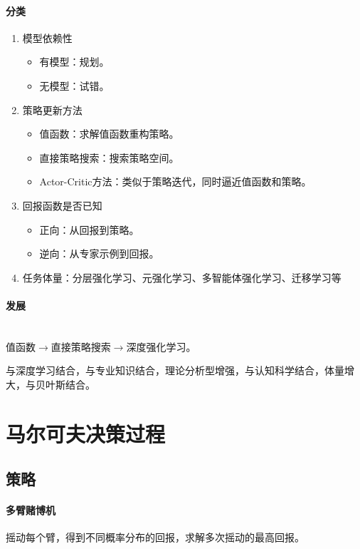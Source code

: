 \documentclass[
12pt, %
a4paper, 
oneside, %
headinclude,footinclude, %
]{scrartcl}
\begin{document}
\paragraph{分类}
\begin{enumerate}
\item 模型依赖性
\begin{itemize}
\item 有模型：规划。
\item 无模型：试错。
\end{itemize}
\item 策略更新方法
\begin{itemize}
\item 值函数：求解值函数重构策略。
\item 直接策略搜索：搜索策略空间。
\item Actor-Critic方法：类似于策略迭代，同时逼近值函数和策略。
\end{itemize}
\item 回报函数是否已知
\begin{itemize}
\item 正向：从回报到策略。
\item 逆向：从专家示例到回报。
\end{itemize}
\item 任务体量：分层强化学习、元强化学习、多智能体强化学习、迁移学习等
\end{enumerate}
\paragraph{发展}~\\

值函数$ \rightarrow $直接策略搜索$ \rightarrow $深度强化学习。

与深度学习结合，与专业知识结合，理论分析型增强，与认知科学结合，体量增大，与贝叶斯结合。
\section{马尔可夫决策过程}
\subsection{策略}
\paragraph{多臂赌博机}
摇动每个臂，得到不同概率分布的回报，求解多次摇动的最高回报。
\end{document}
